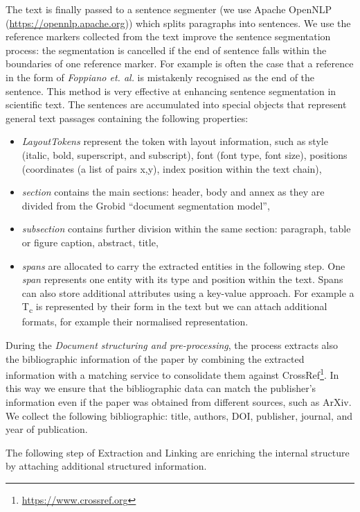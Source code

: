 \documentclass{article}
\begin{document}
The text is finally passed to a sentence segmenter (we use Apache OpenNLP (\url{https://opennlp.apache.org})) which splits paragraphs into sentences. We use the reference markers collected from the text improve the sentence segmentation process: the segmentation is cancelled if the end of sentence falls within the boundaries of one reference marker. For example is often the case that a reference in the form of \textit{Foppiano et. al.} is mistakenly recognised as the end of the sentence. This method is very effective at enhancing sentence segmentation in scientific text. 
The sentences are accumulated into special objects that represent general text passages containing the following properties: 
\begin{itemize}
    \item \textit{LayoutTokens} represent the token with layout information, such as style (italic, bold, superscript, and subscript), font (font type, font size), positions (coordinates (a list of pairs x,y), index position within the text chain), 
    \item \textit{section} contains the main sections: header, body and annex as they are divided from the Grobid ``document segmentation model'', 
    \item \textit{subsection} contains further division within the same section: paragraph, table or figure caption, abstract, title, 
    \item \textit{spans} are allocated to carry the extracted entities in the following step. One \textit{span} represents one entity with its type and position within the text. Spans can also store additional attributes using a key-value approach. For example a T\textsubscript{c} is represented by their form in the text but we can attach additional formats, for example their normalised representation. 
\end{itemize}

During the \textit{Document structuring and pre-processing}, the process extracts also the bibliographic information of the paper by combining the extracted information with a matching service to consolidate them against CrossRef\footnote{\url{https://www.crossref.org}}. In this way we ensure that the bibliographic data can match the publisher's information even if the paper was obtained from different sources, such as ArXiv. We collect the following bibliographic: title, authors, DOI, publisher, journal, and year of publication.

The following step of Extraction and Linking are enriching the internal structure by attaching additional structured information. 
\end{document}
